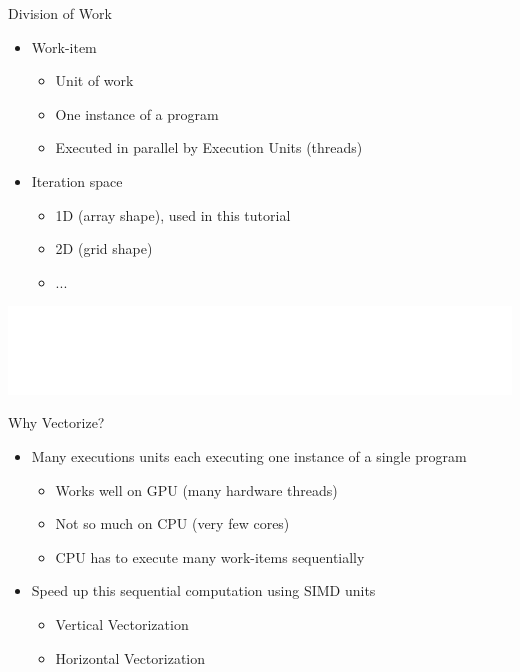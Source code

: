 \begin{frame}{Division of Work}

\begin{itemize}
    \item Work-item
    \begin{itemize}
        \item Unit of work
        \item One instance of a program
        \item Executed in parallel by Execution Units (threads)
    \end{itemize}
    \item Iteration space
    \begin{itemize}
        \item 1D (array shape), used in this tutorial
        \item 2D (grid shape)
        \item ...
    \end{itemize}
\end{itemize}

\vspace{4ex}
\hspace{1em}\includegraphics[scale=0.50]{images/work-items.pdf}

\end{frame}


\begin{frame}{Why Vectorize?}

\begin{itemize}
    \item Many executions units each executing one instance of a single program 
    \begin{itemize}
        \item Works well on GPU (many hardware threads)
        \item Not so much on CPU (very few cores)
        \item CPU has to execute many work-items sequentially
    \end{itemize}
    \item Speed up this sequential computation using SIMD units
    \begin{itemize}
        \item Vertical Vectorization
        \item Horizontal Vectorization
    \end{itemize}
\end{itemize}

\end{frame}

